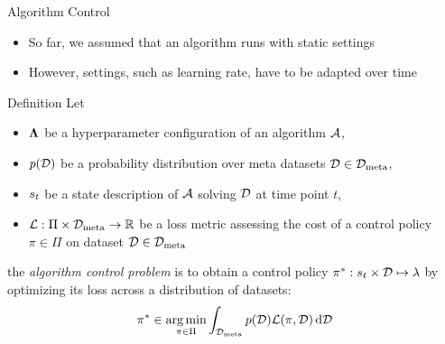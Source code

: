 \begin{frame}[c]{Algorithm Control~}

\begin{itemize}
	\item So far, we assumed that an algorithm runs with static settings
	\item However, settings, such as learning rate, have to be adapted over time
\end{itemize}

\begin{block}{Definition}
	Let 
	\begin{itemize}
		\item $\mathbf{\Lambda}$ be a hyperparameter configuration of an algorithm $\mathcal{A}$,
		\pause
		\item $p(\mathcal{D})$ be a probability distribution over meta datasets $\mathcal{D} \in \mathcal{D}_{\text{meta}}$,
		\pause
		\item $s_t$ be a state description of $\mathcal{A}$ solving $\mathcal{D}$ at time point $t$,
		\pause
		\item $\mathcal{L}: \Pi \times \mathcal{D}_{\text{meta}} \to \mathbb{R}$ be a loss metric assessing the cost of a control policy $\pi \in \Pi$ on dataset $\mathcal{D} \in \mathcal{D}_{\text{meta}}$
	\end{itemize}
	
	\pause
	the \emph{algorithm control problem} is to obtain a control policy $\pi^* : s_t \times \mathcal{D} \mapsto \mathbf{\lambda}$ by optimizing its loss across a distribution of datasets:
	\begin{equation}
	\pi^* \in \operatorname*{arg\,min}_{\pi \in \Pi} \int_{\mathcal{D}_{\text{meta}}} p(\mathcal{D}) \mathcal{L}(\pi, \mathcal{D}) \mathop{}\!\mathrm{d} \mathcal{D} \nonumber
	\end{equation}
\end{block}

\end{frame}

